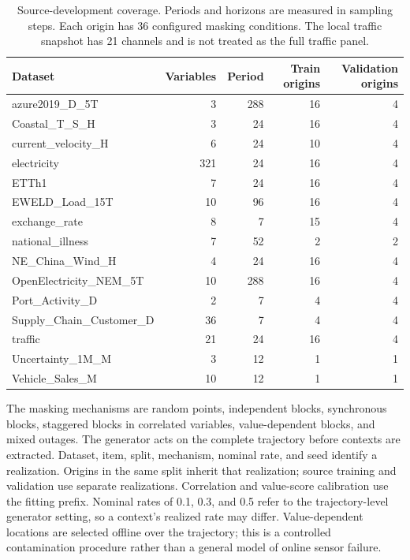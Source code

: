 \documentclass{article}
\begin{document}
\begin{table}[h]
\centering\small
\caption{Source-development coverage. Periods and horizons are measured in sampling steps. Each origin has 36 configured masking conditions. The local traffic snapshot has 21 channels and is not treated as the full traffic panel.}
\label{tab:source-inventory}
\begin{tabular}{lrrrr}
\toprule
Dataset & Variables & Period & Train origins & Validation origins\\
\midrule
azure2019\_D\_5T & 3 & 288 & 16 & 4\\
Coastal\_T\_S\_H & 3 & 24 & 16 & 4\\
current\_velocity\_H & 6 & 24 & 10 & 4\\
electricity & 321 & 24 & 16 & 4\\
ETTh1 & 7 & 24 & 16 & 4\\
EWELD\_Load\_15T & 10 & 96 & 16 & 4\\
exchange\_rate & 8 & 7 & 15 & 4\\
national\_illness & 7 & 52 & 2 & 2\\
NE\_China\_Wind\_H & 4 & 24 & 16 & 4\\
OpenElectricity\_NEM\_5T & 10 & 288 & 16 & 4\\
Port\_Activity\_D & 2 & 7 & 4 & 4\\
Supply\_Chain\_Customer\_D & 36 & 7 & 4 & 4\\
traffic & 21 & 24 & 16 & 4\\
Uncertainty\_1M\_M & 3 & 12 & 1 & 1\\
Vehicle\_Sales\_M & 10 & 12 & 1 & 1\\
\bottomrule
\end{tabular}
\end{table}

The masking mechanisms are random points, independent blocks, synchronous blocks, staggered blocks in correlated variables, value-dependent blocks, and mixed outages. The generator acts on the complete trajectory before contexts are extracted. Dataset, item, split, mechanism, nominal rate, and seed identify a realization. Origins in the same split inherit that realization; source training and validation use separate realizations. Correlation and value-score calibration use the fitting prefix. Nominal rates of 0.1, 0.3, and 0.5 refer to the trajectory-level generator setting, so a context's realized rate may differ. Value-dependent locations are selected offline over the trajectory; this is a controlled contamination procedure rather than a general model of online sensor failure.
\end{document}
